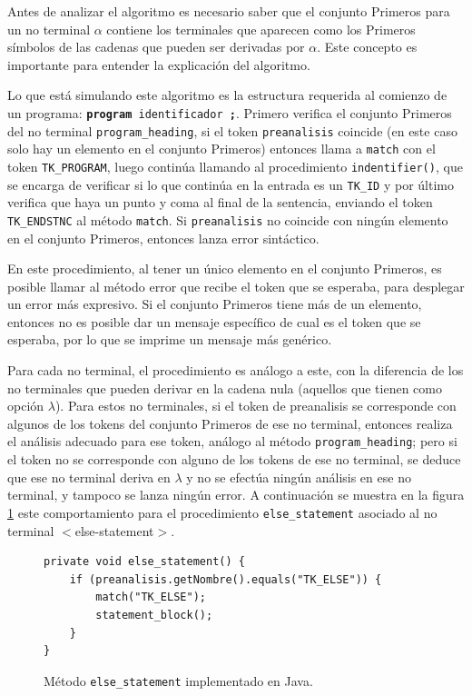 Antes de analizar el algoritmo es necesario saber que el conjunto Primeros para un no terminal $\alpha$ contiene los terminales que aparecen como los Primeros símbolos de las cadenas que pueden ser derivadas por $\alpha$. Este concepto es importante para entender la explicación del algoritmo.

Lo que está simulando este algoritmo es la estructura requerida al comienzo de un programa: \texttt{{\bf program} identificador {\bf ;}}. Primero verifica el conjunto Primeros del no terminal \texttt{program\_heading}, si el token \texttt{preanalisis} coincide (en este caso solo hay un elemento en el conjunto Primeros) entonces llama a \texttt{match} con el token \texttt{TK\_PROGRAM}, luego continúa llamando al procedimiento \texttt{indentifier()}, que se encarga de verificar si lo que  continúa en la entrada es un \texttt{TK\_ID} y por último verifica que haya un punto y coma al final de la sentencia, enviando el token \texttt{TK\_ENDSTNC} al método \texttt{match}. Si \texttt{preanalisis} no coincide con ningún elemento en el conjunto Primeros, entonces lanza error sintáctico.

En este procedimiento, al tener un único elemento en el conjunto Primeros, es posible llamar al método error que recibe el token que se esperaba, para desplegar un error más expresivo. Si el conjunto Primeros tiene más de un elemento, entonces no es posible dar un mensaje específico de cual es el token que se esperaba, por lo que se imprime un mensaje más genérico. 

Para cada no terminal, el procedimiento es análogo a este, con la diferencia de los no terminales que pueden derivar en la cadena nula (aquellos que tienen como opción $\lambda$). Para estos no terminales, si el token de preanalisis se corresponde con algunos de los tokens del conjunto Primeros de ese no terminal, entonces realiza el análisis adecuado para ese token, análogo al método \texttt{program\_heading}; pero si el token no se corresponde con alguno de los tokens de ese no terminal, se deduce que ese no terminal deriva en $\lambda$ y no se efectúa ningún análisis en ese no terminal, y tampoco se lanza ningún error. A continuación se muestra en la figura \ref{fig:metodo_else_statement} este comportamiento para el procedimiento \texttt{else\_statement} asociado al no terminal $<$else-statement$>$.

\begin{figure}[H]
\begin{verbatim}
private void else_statement() {
	if (preanalisis.getNombre().equals("TK_ELSE")) {
		match("TK_ELSE");
		statement_block();
	}
}
\end{verbatim}
\caption{Método \texttt{else\_statement} implementado en Java.}
\label{fig:metodo_else_statement}
\end{figure}

